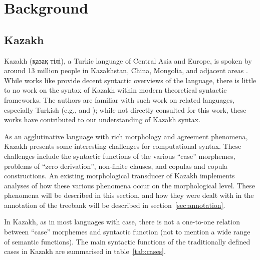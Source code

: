 \documentclass[a4paper,11pt, onecolumn,twoside]{article}
\begin{document}
\section{Background}\label{sec:back}

\subsection{Kazakh}\label{sec:kazakh}

Kazakh (қазақ тілі), a Turkic language of Central Asia and Europe, is spoken by around 13 million people in Kazakhstan, China, Mongolia, and adjacent areas \parencite{ethnologue}.  While works like \textcite{Balaqayev54} provide decent syntactic overviews of the language, there is little to no work on the syntax of Kazakh within modern theoretical syntactic frameworks.  The authors are familiar with such work on related languages, especially Turkish (e.g., \cite{Kornfilt97} and \cite{GokselKerslake05}); while not directly consulted for this work, these works have contributed to our understanding of Kazakh syntax.

As an agglutinative language with rich morphology and agreement phenomena, Kazakh presents some interesting challenges for computational syntax.  These challenges include the syntactic functions of the various ``case'' morphemes, problems of ``zero derivation'', non-finite clauses, and copulas and copula constructions.  An existing morphological transducer of Kazakh \parencite{Washington14} implements analyses of how these various phenomena occur on the morphological level.  These phenomena will be described in this section, and how they were dealt with in the annotation of the treebank will be described in section~\ref{sec:annotation}. 

In Kazakh, as in most languages with case, there is not a one-to-one relation between ``case'' morphemes and syntactic function (not to mention a wide range of semantic functions).  The main syntactic functions of the traditionally defined cases in Kazakh are summarised in table~\ref{tab:cases}.
\end{document}
